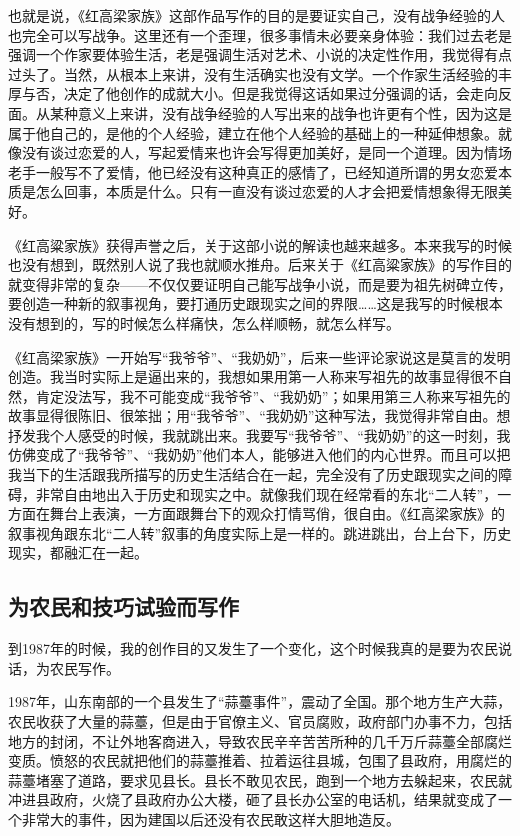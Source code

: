 \documentclass[fontset=fandol,12pt,a5paper]{ctexbook}
\begin{document}
也就是说，《红高梁家族》这部作品写作的目的是要证实自己，没有战争经验的人也完全可以写战争。这里还有一个歪理，很多事情未必要亲身体验：我们过去老是强调一个作家要体验生活，老是强调生活对艺术、小说的决定性作用，我觉得有点过头了。当然，从根本上来讲，没有生活确实也没有文学。一个作家生活经验的丰厚与否，决定了他创作的成就大小。但是我觉得这话如果过分强调的话，会走向反面。从某种意义上来讲，没有战争经验的人写出来的战争也许更有个性，因为这是属于他自己的，是他的个人经验，建立在他个人经验的基础上的一种延伸想象。就像没有谈过恋爱的人，写起爱情来也许会写得更加美好，是同一个道理。因为情场老手一般写不了爱情，他已经没有这种真正的感情了，已经知道所谓的男女恋爱本质是怎么回事，本质是什么。只有一直没有谈过恋爱的人才会把爱情想象得无限美好。

《红高粱家族》获得声誉之后，关于这部小说的解读也越来越多。本来我写的时候也没有想到，既然别人说了我也就顺水推舟。后来关于《红高粱家族》的写作目的就变得非常的复杂——不仅仅要证明自己能写战争小说，而是要为祖先树碑立传，要创造一种新的叙事视角，要打通历史跟现实之间的界限……这是我写的时候根本没有想到的，写的时候怎么样痛快，怎么样顺畅，就怎么样写。

《红高梁家族》一开始写“我爷爷”、“我奶奶”，后来一些评论家说这是莫言的发明创造。我当时实际上是逼出来的，我想如果用第一人称来写祖先的故事显得很不自然，肯定没法写，我不可能变成“我爷爷”、“我奶奶”；如果用第三人称来写祖先的故事显得很陈旧、很笨拙；用“我爷爷”、“我奶奶”这种写法，我觉得非常自由。想抒发我个人感受的时候，我就跳出来。我要写“我爷爷”、“我奶奶”的这一时刻，我仿佛变成了“我爷爷”、“我奶奶”他们本人，能够进入他们的内心世界。而且可以把我当下的生活跟我所描写的历史生活结合在一起，完全没有了历史跟现实之间的障碍，非常自由地出入于历史和现实之中。就像我们现在经常看的东北“二人转”，一方面在舞台上表演，一方面跟舞台下的观众打情骂俏，很自由。《红高梁家族》的叙事视角跟东北“二人转”叙事的角度实际上是一样的。跳进跳出，台上台下，历史现实，都融汇在一起。

\subsection{为农民和技巧试验而写作}

到1987年的时候，我的创作目的又发生了一个变化，这个时候我真的是要为农民说话，为农民写作。

1987年，山东南部的一个县发生了“蒜薹事件”，震动了全国。那个地方生产大蒜，农民收获了大量的蒜薹，但是由于官僚主义、官员腐败，政府部门办事不力，包括地方的封闭，不让外地客商进入，导致农民辛辛苦苦所种的几千万斤蒜薹全部腐烂变质。愤怒的农民就把他们的蒜薹推着、拉着运往县城，包围了县政府，用腐烂的蒜薹堵塞了道路，要求见县长。县长不敢见农民，跑到一个地方去躲起来，农民就冲进县政府，火烧了县政府办公大楼，砸了县长办公室的电话机，结果就变成了一个非常大的事件，因为建国以后还没有农民敢这样大胆地造反。
\end{document}
